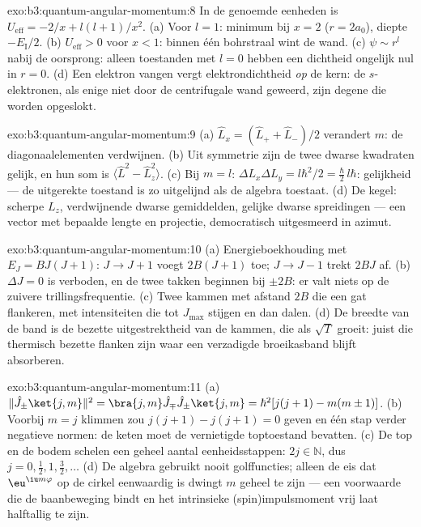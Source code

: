 \begin{solution}{exo:b3:quantum-angular-momentum:8}
In de genoemde eenheden is $U_{\text{eff}} = -2/x + l(l+1)/x^2$. (a) Voor
$l = 1$: minimum bij $x = 2$ ($r = 2a_0$), diepte $-E_{\text{I}}/2$.
(b) $U_{\text{eff}} > 0$ voor $x < 1$: binnen één bohrstraal wint de wand.
(c) $\psi \sim r^l$ nabij de oorsprong: alleen toestanden met $l = 0$
hebben een dichtheid ongelijk nul in $r = 0$. (d) Een elektron vangen
vergt elektrondichtheid \emph{op} de kern: de $s$-elektronen, als enige
niet door de centrifugale wand geweerd, zijn degene die worden
opgeslokt.
\end{solution}

\begin{solution}{exo:b3:quantum-angular-momentum:9}
(a) $\hat L_x = (\hat L_+ + \hat L_-)/2$ verandert $m$: de
diagonaalelementen verdwijnen. (b) Uit symmetrie zijn de twee dwarse
kwadraten gelijk, en hun som is $\langle\hat L^2 - \hat L_z^2\rangle$. (c)
Bij $m = l$: $\Delta L_x\Delta L_y = l\hbar^2/2 = \tfrac\hbar2
\,l\hbar$: gelijkheid --- de uitgerekte toestand is zo uitgelijnd als de
algebra toestaat. (d) De kegel: scherpe $L_z$, verdwijnende dwarse
gemiddelden, gelijke dwarse spreidingen --- een vector met bepaalde lengte
en projectie, democratisch uitgesmeerd in azimut.
\end{solution}

\begin{solution}{exo:b3:quantum-angular-momentum:10}
(a) Energieboekhouding met $E_J = BJ(J+1)$: $J \to J + 1$ voegt
$2B(J+1)$ toe; $J \to J - 1$ trekt $2BJ$ af. (b) $\Delta J = 0$ is
verboden, en de twee takken beginnen bij $\pm 2B$: er valt niets op de
zuivere trillingsfrequentie. (c) Twee kammen met afstand $2B$ die een gat
flankeren, met intensiteiten die tot $J_{\max}$ stijgen en dan dalen. (d)
De breedte van de band is de bezette uitgestrektheid van de kammen, die
als $\sqrt{T}$ groeit: juist die thermisch bezette flanken zijn waar een
verzadigde broeikasband blijft absorberen.
\end{solution}

\begin{solution}{exo:b3:quantum-angular-momentum:11}
(a) $\|\hat J_\pm\ket{j,m}\|^2 = \bra{j,m}\hat J_\mp\hat J_\pm
\ket{j,m} = \hbar^2[j(j+1) - m(m\pm1)]$. (b) Voorbij $m = j$ klimmen zou
$j(j+1) - j(j+1) = 0$ geven en één stap verder negatieve normen: de keten
moet de vernietigde toptoestand bevatten. (c) De top en de bodem schelen
een geheel aantal eenheidsstappen: $2j \in
\mathbb N$, dus $j = 0, \tfrac12, 1, \tfrac32, \dots$ (d) De algebra gebruikt nooit golffuncties;
alleen de eis dat $\eu^{\iu m\varphi}$ op de cirkel eenwaardig is dwingt
$m$ geheel te zijn --- een voorwaarde die de baanbeweging bindt en het
intrinsieke (spin)impulsmoment vrij laat halftallig te zijn.
\end{solution}

